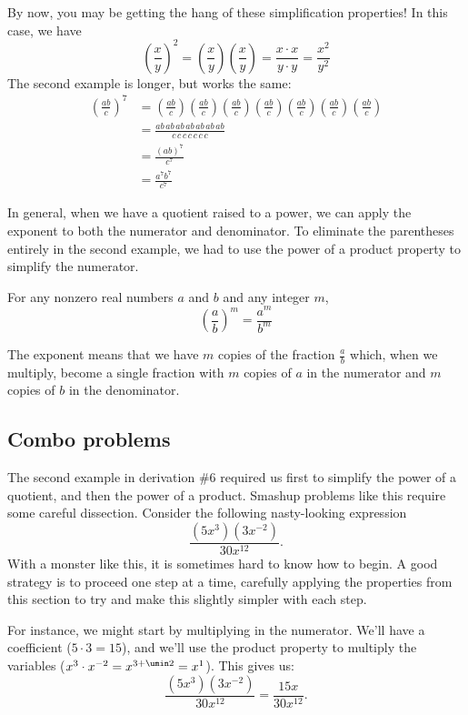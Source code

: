 By now, you may be getting the hang of these simplification properties! In this case, we have
\[\left(\frac{x}{y}\right)^2 = \left(\frac{x}{y}\right)\left(\frac{x}{y}\right) = \frac{x\cdot x}{y\cdot y} = \frac{x^2}{y^2}\]
The second example is longer, but works the same:
\[\begin{aligned}
\left(\frac{ab}{c}\right)^7
&= \left(\frac{ab}{c}\right)\left(\frac{ab}{c}\right)\left(\frac{ab}{c}\right)\left(\frac{ab}{c}\right)\left(\frac{ab}{c}\right)\left(\frac{ab}{c}\right)\left(\frac{ab}{c}\right)
\\[1ex]&= \frac{ab\,ab\,ab\,ab\,ab\,ab\,ab}{c\,c\,c\,c\,c\,c\,c}
\\[1ex]&= \frac{(ab)^7}{c^7}
\\[1ex]&= \frac{a^7b^7}{c^7}
\end{aligned}\]

In general, when we have a quotient raised to a power, we can apply the exponent to both the numerator and denominator. To eliminate the parentheses entirely in the second example, we had to use the power of a product property to simplify the numerator.

\begin{boxdef}
For any nonzero real numbers $a$ and $b$ and any integer $m$, \[\left(\frac{a}{b}\right)^m = \frac{a^m}{b^m}\]
\end{boxdef}

The exponent means that we have $m$ copies of the fraction $\frac{a}{b}$ which, when we multiply, become a single fraction with $m$ copies of $a$ in the numerator and $m$ copies of $b$ in the denominator.

\subsection{Combo problems}

The second example in derivation \#6 required us first to simplify the power of a quotient, and then the power of a product. Smashup problems like this require some careful dissection. Consider the following nasty-looking expression
\[\frac{(5x^3)(3x^{-2})}{30x^{12}}.\]
With a monster like this, it is sometimes hard to know how to begin. A good strategy is to proceed one step at a time, carefully applying the properties from this section to try and make this slightly simpler with each step.

For instance, we might start by multiplying in the numerator. We'll have a coefficient ($5\cdot3 = 15$), and we'll use the product property to multiply the variables ($x^3 \cdot x^{-2} = x^{3+\umin2} = x^1$). This gives us:
\[\frac{(5x^3)(3x^{-2})}{30x^{12}} = \frac{15x}{30x^{12}}.\]

